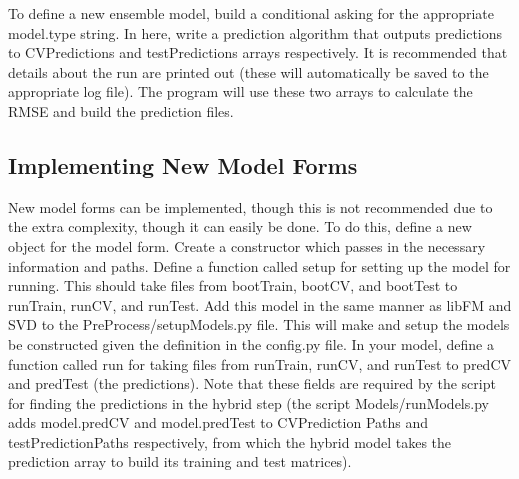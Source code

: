 \documentclass{article}
\begin{document}
To define a new ensemble model, build a conditional asking for the appropriate model.type string. In here, write a prediction algorithm that outputs predictions to CVPredictions and testPredictions arrays respectively. It is recommended that details about the run are printed out (these will automatically be saved to the appropriate log file). The program will use these two arrays to calculate the RMSE and build the prediction files.

\subsection{Implementing New Model Forms}

New model forms can be implemented, though this is not recommended due to the extra complexity, though it can easily be done. To do this, define a new object for the model form. Create a constructor which passes in the necessary information and paths.  Define a function called setup for setting up the model for running. This should take files from bootTrain, bootCV, and bootTest to runTrain, runCV, and runTest.  Add this model in the same manner as libFM and SVD to the PreProcess/setupModels.py file. This will make and setup the models be constructed given the definition in the config.py file. In your model, define a function called run for taking files from runTrain, runCV, and runTest to predCV and predTest (the predictions). Note that these fields are required by the script for finding the predictions in the hybrid step (the script Models/runModels.py adds model.predCV and model.predTest to CVPrediction Paths and testPredictionPaths respectively, from which the hybrid model takes the prediction array to build its training and test matrices).
\end{document}
